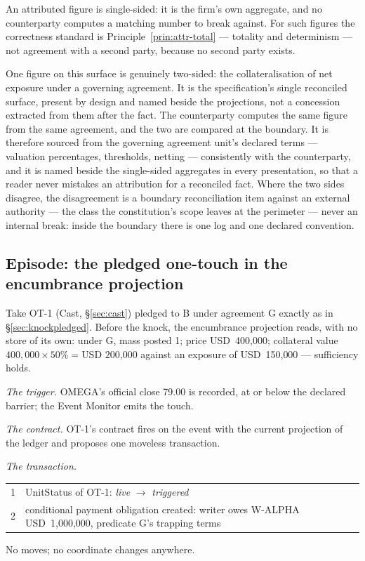 \documentclass[11pt,a4paper]{article}
\newcommand{\USD}[1]{\mbox{USD~#1}}
\begin{document}
An attributed figure is single-sided: it is the firm's own aggregate, and no
counterparty computes a matching number to break against. For such figures the
correctness standard is Principle~\ref{prin:attr-total} --- totality and
determinism --- not agreement with a second party, because no second party
exists.

One figure on this surface is genuinely two-sided: the collateralisation of net
exposure under a governing agreement. It is the specification's single reconciled
surface, present by design and named beside the projections, not a concession
extracted from them after the fact. The counterparty computes the same figure
from the same agreement, and the two are compared at the boundary. It is
therefore sourced from the governing agreement unit's declared terms ---
valuation percentages, thresholds, netting --- consistently with the
counterparty, and it is named beside the single-sided aggregates in every
presentation, so that a reader never mistakes an attribution for a reconciled
fact. Where the two sides disagree, the disagreement is a boundary
reconciliation item against an external authority --- the class the
constitution's scope leaves at the perimeter --- never an internal break: inside
the boundary there is one log and one declared convention.

\subsection{Episode: the pledged one-touch in the encumbrance projection}

Take OT-1 (Cast, \S\ref{sec:cast}) pledged to B under agreement G exactly as in
\S\ref{sec:knockpledged}. Before the knock, the encumbrance projection reads, with no
store of its own: under G, mass posted 1; price \USD{400{,}000}; collateral value
$400{,}000 \times 50\% = \USD{200{,}000}$ against an exposure of
\USD{150{,}000} --- sufficiency holds.

\emph{The trigger.} OMEGA's official close 79.00 is recorded, at or below the
declared barrier; the Event Monitor emits the touch.

\emph{The contract.} OT-1's contract fires on the event with the current
projection of the ledger and proposes one moveless transaction.

\emph{The transaction.}
\begin{center}
\begin{tabular}{@{}rl@{}}
\toprule
1 & UnitStatus of OT-1: \emph{live} $\to$ \emph{triggered} \\
2 & conditional payment obligation created: writer owes W-ALPHA
    \USD{1{,}000{,}000}, predicate G's trapping terms \\
\bottomrule
\end{tabular}
\end{center}
No moves; no coordinate changes anywhere.
\end{document}
